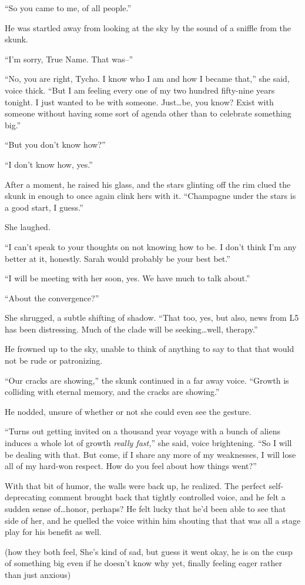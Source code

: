 ``So you came to me, of all people.''

He was startled away from looking at the sky by the sound of a sniffle from the skunk.

``I'm sorry, True Name. That was--''

``No, you are right, Tycho. I know who I am and how I became that,'' she said, voice thick. ``But I am feeling every one of my two hundred fifty-nine years tonight. I just wanted to be with someone. Just\ldots be, you know? Exist with someone without having some sort of agenda other than to celebrate something big.''

``But you don't know how?''

``I don't know how, yes.''

After a moment, he raised his glass, and the stars glinting off the rim clued the skunk in enough to once again clink hers with it. ``Champagne under the stars is a good start, I guess.''

She laughed.

``I can't speak to your thoughts on not knowing how to be. I don't think I'm any better at it, honestly. Sarah would probably be your best bet.''

``I will be meeting with her soon, yes. We have much to talk about.''

``About the convergence?''

She shrugged, a subtle shifting of shadow. ``That too, yes, but also, news from L5 has been distressing. Much of the clade will be seeking\ldots well, therapy.''

He frowned up to the sky, unable to think of anything to say to that that would not be rude or patronizing.

``Our cracks are showing,'' the skunk continued in a far away voice. ``Growth is colliding with eternal memory, and the cracks are showing.''

He nodded, unsure of whether or not she could even see the gesture.

``Turns out getting invited on a thousand year voyage with a bunch of aliens induces a whole lot of growth \emph{really fast,}'' she said, voice brightening. ``So I will be dealing with that. But come, if I share any more of my weaknesses, I will lose all of my hard-won respect. How do you feel about how things went?''

With that bit of humor, the walls were back up, he realized. The perfect self-deprecating comment brought back that tightly controlled voice, and he felt a sudden sense of\ldots honor, perhaps? He felt lucky that he'd been able to see that side of her, and he quelled the voice within him shouting that that was all a stage play for his benefit as well.

(how they both feel, She's kind of sad, but guess it went okay, he is on the cusp of something big even if he doesn't know why yet, finally feeling eager rather than just anxious)
